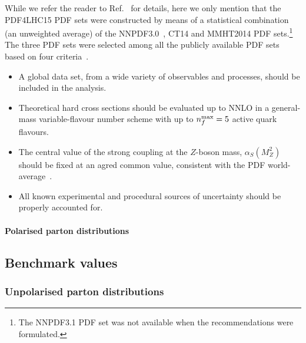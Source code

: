 While we refer the reader to Ref.~\cite{Butterworth:2015oua} for details,
here we only mention that the PDF4LHC15 PDF sets were constructed by means of
a statistical combination (an unweighted average) of the 
NNPDF3.0~\cite{Ball:2014uwa}, CT14 and MMHT2014 PDF sets.\footnote{The 
NNPDF3.1 PDF set was not available when the recommendations were formulated.}
%
The three PDF sets were selected among all the publicly available PDF sets
based on four criteria~\cite{Butterworth:2015oua}.
%
\begin{itemize}
%
\item A global data set, from a wide variety of observables and processes, 
should be included in the analysis.
%
\item Theoretical hard cross sections should be evaluated up to NNLO in a
general-mass variable-flavour number scheme with up to $n_f^{\rm max}=5$ 
active quark flavours.
%
\item The central value of the strong coupling at the $Z$-boson mass,
$\alpha_S(M_Z^2)$ should be fixed at an agred common value, consistent with the 
PDF world-average~\cite{Olive:2016xmw}.
%
\item All known experimental and procedural sources of uncertainty should be 
properly accounted for.
%
\end{itemize}
 





\paragraph{Polarised parton distributions}




\subsection{Benchmark values}
\label{subsec:BN}

\subsubsection{Unpolarised parton distributions}

